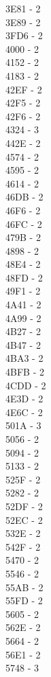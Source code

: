 \documentclass[10pt,letterpaper]{article}
\begin{document}
\begin{multicols}{5}
3E81 -  2\\
3E89 -  2\\
3FD6 -  2\\
4000 -  2\\
4152 -  2\\
4183 -  2\\
42EF -  2\\
42F5 -  2\\
42F6 -  2\\
4324 -  3\\
442E -  2\\
4574 -  2\\
4595 -  2\\
4614 -  2\\
46DB -  2\\
46F6 -  2\\
46FC -  2\\
479B -  2\\
4898 -  2\\
48E4 -  2\\
48FD -  2\\
49F1 -  2\\
4A41 -  2\\
4A99 -  2\\
4B27 -  2\\
4B47 -  2\\
4BA3 -  2\\
4BFB -  2\\
4CDD -  2\\
4E3D -  2\\
4E6C -  2\\
501A -  3\\
5056 -  2\\
5094 -  2\\
5133 -  2\\
525F -  2\\
5282 -  2\\
52DF -  2\\
52EC -  2\\
532E -  2\\
542F -  2\\
5470 -  2\\
5546 -  2\\
55AB -  2\\
55FD -  2\\
5605 -  2\\
562E -  2\\
5664 -  2\\
56E1 -  2\\
5748 -  3\\

\end{multicols}
\end{document}
